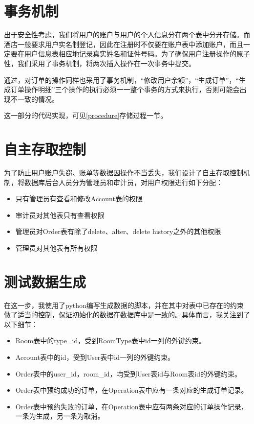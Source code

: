 \documentclass{myreport}
\begin{document}
\section{事务机制}
出于安全性考虑，我们将用户的账户与用户的个人信息分在两个表中分开存储。而酒店一般要求用户实名制登记，因此在注册时不仅要在账户表中添加账户，而且一定要在用户信息表相应地记录真实姓名和证件号码。为了确保用户注册操作的原子性，我们采用了事务机制，将两次插入操作在一次事务中提交。

通过，对订单的操作同样也采用了事务机制，“修改用户余额”，“生成订单”，“生成订单操作明细”三个操作的执行必须一一整个事务的方式来执行，否则可能会出现不一致的情况。

这一部分的代码实现，可见\autoref{procedure}存储过程一节。

\section{自主存取控制}
为了防止用户账户失窃、账单等数据因操作不当丢失，我们设计了自主存取控制机制，将数据库后台人员分为管理员和审计员，对用户权限进行如下分配： 
\begin{itemize}
    \item 只有管理员有查看和修改Account表的权限
    \item 审计员对其他表只有查看权限
    \item 管理员对Order表有除了delete、alter、delete history之外的其他权限
    \item 管理员对其他表有所有权限
\end{itemize}

\section{测试数据生成}

在这一步，我使用了python编写生成数据的脚本，并在其中对表中已存在的约束做了适当的控制，保证初始化的数据在数据库中是一致的。具体而言，我关注到了以下细节：

\begin{itemize}
    \item Room表中的type\_id，受到RoomType表中id一列的外键约束。
    \item Account表中的id，受到User表中id一列的外键约束。
    \item Order表中的user\_id，room\_id，均受到User表id与Room表id的外键约束。
    \item Order表中预约成功的订单，在Operation表中应有一条对应的生成订单记录。
    \item Order表中预约失败的订单，在Operation表中应有两条对应的订单操作记录，一条为生成，另一条为取消。
\end{itemize}
\end{document}

